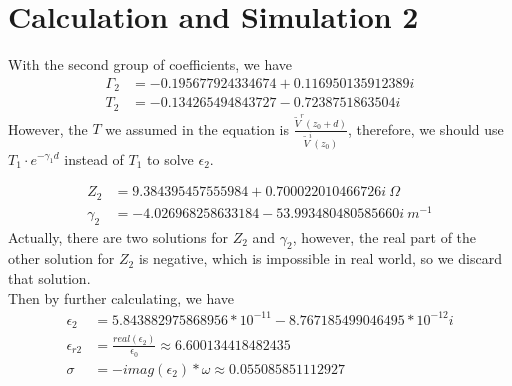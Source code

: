 \documentclass{article}
\begin{document}
\section{Calculation and Simulation 2}
With the second group of coefficients, we have
\begin{align*}
    \Gamma_2 &= -0.195677924334674+0.116950135912389i\\
    T_2 &= -0.134265494843727-0.7238751863504i
\end{align*}
However, the $T$ we assumed in the equation is $\frac{\tilde{V}^r(z_0+d)}{\tilde{V}^i(z_0)}$,
therefore, we should use $T_1\cdot e^{-\gamma_1 d}$ instead of $T_1$ to solve $\epsilon_2$.

\begin{align*}
    Z_2 &=   9.384395457555984 + 0.700022010466726i\ \Omega \\
    \gamma_2 &= -4.026968258633184 -53.993480480585660i\ m^{-1}
\end{align*}
Actually, there are two solutions for $Z_2$ and $\gamma_2$, however, the real part of the other solution for $Z_2$ is negative,
which is impossible in real world, so we discard that solution.\\

Then by further calculating, we have
\begin{align*}
    \epsilon_2 &=  5.843882975868956*10^{-11} - 8.767185499046495*10^{-12}i\\
    \epsilon_{r2} &= \frac{real(\epsilon_2)}{\epsilon_0}\approx    6.600134418482435\\
    \sigma &= -imag(\epsilon_2)*\omega \approx 0.055085851112927
\end{align*}
\end{document}
